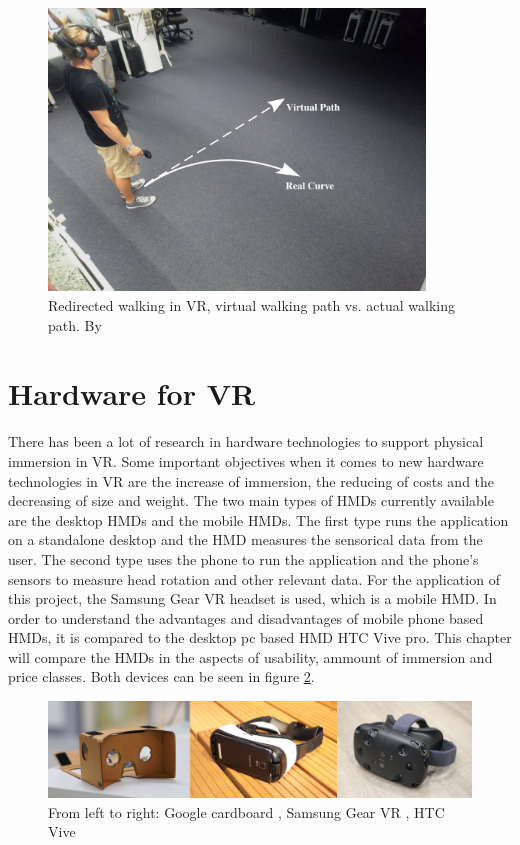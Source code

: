 \begin{figure}[h!]
  \includegraphics[width=10cm]{kapitel/redirected-walking.jpg}
  \centering
  \caption{Redirected walking in VR, virtual walking path vs. actual walking path. By \cite{LS18}}
  \label{fig:walking}
\end{figure}

\section{Hardware for VR}
There has been a lot of research in hardware technologies to support physical immersion in VR. Some important objectives when it comes to new hardware technologies in VR are the increase of immersion, the reducing of costs and the decreasing of size and weight. The two main types of HMDs currently available are the desktop HMDs and the mobile HMDs. The first type runs the application on a standalone desktop and the HMD measures the sensorical data from the user. The second type uses the phone to run the application and the phone's sensors to measure head rotation and other relevant data. For the application of this project, the Samsung Gear VR headset is used, which is a mobile HMD. In order to understand the advantages and disadvantages of mobile phone based HMDs, it is compared to the desktop pc based HMD HTC Vive pro. This chapter will compare the HMDs in the aspects of usability, ammount of immersion and price classes. Both devices can be seen in figure \ref{fig:devices}.

\begin{figure}[h!]
  \includegraphics[width=14cm]{kapitel/hmd-devices.jpg}
  \centering
  \caption{From left to right: Google cardboard \cite{cardboard}, Samsung Gear VR \cite{gearvr}, HTC Vive \cite{vive}}
  \label{fig:devices}
\end{figure}

